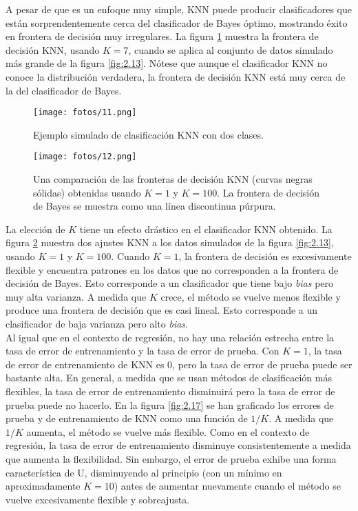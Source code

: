 A pesar de que es un enfoque muy simple, KNN puede producir clasificadores que están sorprendentemente cerca del clasificador de Bayes óptimo, mostrando éxito en frontera de decisión muy irregulares. La figura \ref{fig:2.15} muestra la frontera de decisión KNN, usando $K = 7$, cuando se aplica al conjunto de datos simulado más grande de la figura \ref{fig:2.13}. Nótese que aunque el clasificador KNN no conoce la distribución verdadera, la frontera de decisión KNN está muy cerca de la del clasificador de Bayes. \\

\begin{figure}[h]
\centering
\texttt{[image: fotos/11.png]}
\caption{Ejemplo simulado de clasificación KNN con dos clases.}
\label{fig:2.15}
\end{figure}

\begin{figure}[h]
\centering
\texttt{[image: fotos/12.png]}
\caption{Una comparación de las fronteras de decisión KNN (curvas negras sólidas) obtenidas usando $K = 1$ y $K = 100$. La frontera de decisión de Bayes se muestra como una línea discontinua púrpura.}
\label{fig:2.16}
\end{figure}

La elección de $K$ tiene un efecto drástico en el clasificador KNN obtenido. La figura \ref{fig:2.16} muestra dos ajustes KNN a los datos simulados de la figura \ref{fig:2.13}, usando $K = 1$ y $K = 100$. Cuando $K = 1$, la frontera de decisión es excesivamente flexible y encuentra patrones en los datos que no corresponden a la frontera de decisión de Bayes. Esto corresponde a un clasificador que tiene bajo \textit{bias} pero muy alta varianza. A medida que $K$ crece, el método se vuelve menos flexible y produce una frontera de decisión que es casi lineal. Esto corresponde a un clasificador de baja varianza pero alto \textit{bias}. \\

Al igual que en el contexto de regresión, no hay una relación estrecha entre la tasa de error de entrenamiento y la tasa de error de prueba. Con $K = 1$, la tasa de error de entrenamiento de KNN es 0, pero la tasa de error de prueba puede ser bastante alta. En general, a medida que se usan métodos de clasificación más flexibles, la tasa de error de entrenamiento disminuirá pero la tasa de error de prueba puede no hacerlo. En la figura \ref{fig:2.17} se han graficado los errores de prueba y de entrenamiento de KNN como una función de $1/K$. A medida que $1/K$ aumenta, el método se vuelve más flexible. Como en el contexto de regresión, la tasa de error de entrenamiento disminuye consistentemente a medida que aumenta la flexibilidad. Sin embargo, el error de prueba exhibe una forma característica de U, disminuyendo al principio (con un mínimo en aproximadamente $K = 10$) antes de aumentar nuevamente cuando el método se vuelve excesivamente flexible y sobreajusta. \\


